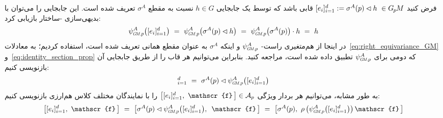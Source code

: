 فرض کنید $[e_{i}]_{i=1}^d := \sigma^A(p)\lhd h\ \in G_{\mkern-1.3mu p}\mkern-1.2muM$ قابی باشد که توسط یک جابجایی $h\in G$ نسبت به مقطع $\sigma^A$ تعریف شده است.
این جابجایی را می‌توان با بدیهی‌سازی -ساختار بازیابی کرد:
\begin{align}
	\psiGMp^A \!\left([e_{i}]_{i=1}^d\right)
	\ =\ \psiGMp^A \!\left( \sigma^A(p)\lhd h \right)
	\ =\ \psiGMp^A \!\left( \sigma^A(p) \right) \cdot h
	\ =\ h
\end{align}
در اینجا از هم‌متغیری راست- $\psiGMp^A$ و اینکه $\sigma^A$ به عنوان مقطع همانی تعریف شده است، استفاده کردیم؛ به معادلات~\eqref{eq:right_equivariance_GM} و~\eqref{eq:identity_section_prop} که دومی برای $\psiGMp^A$ تطبیق داده شده است، مراجعه کنید.
بنابراین می‌توانیم هر قاب را از طریق جابجایی آن بازنویسی کنیم:
\begin{align}
	[e_{i}]_{i=1}^d
	\ =\ \sigma^A(p) \lhd \psiGMp^A \!\left([e_{i}]_{i=1}^d\right)
\end{align}
به طور مشابه، می‌توانیم هر بردار ویژگی $\big[ [e_{i}]_{i=1}^d,\ \mathscr{f}\,\big]\in\A_p$ را با نمایندگان مختلف کلاس هم‌ارزی بازنویسی کنیم:
\begin{align}
	\left[ [e_{i}]_{i=1}^d,\ \mathscr{f}\,\right]
	\ =\ \left[ \sigma^A(p) \lhd \psiGMp^A\big([e_{i}]_{i=1}^d\big),\,\ \mathscr{f}\,\right]
	\ =\ \left[ \sigma^A(p),\ \rho\left(\psiGMp^A\big([e_{i}]_{i=1}^d\big)\right) \mathscr{f}\,\right]
\end{align}

